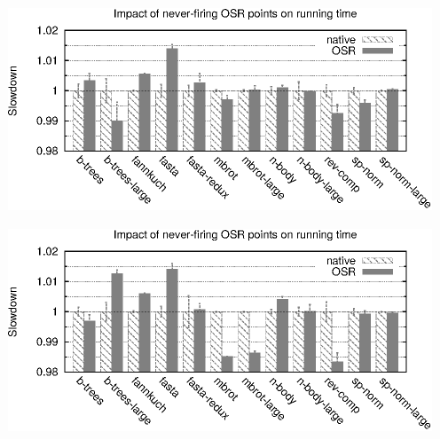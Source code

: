 \begin{description}
\ifdefined\noauthorea
\begin{figure}[hb]
\begin{center}
\includegraphics[width=0.95\columnwidth]{figures/code-quality-noBB/code-quality-noBB.eps}
\caption{\protect}
\end{center}
\end{figure}
\fi

\ifdefined\noauthorea
\begin{figure}[b]
\begin{center}
\includegraphics[width=0.95\columnwidth]{figures/code-quality-O1-noBB/code-quality-O1-noBB.eps}
\caption{\protect}
\end{center}
\end{figure}
\fi


\end{description}
